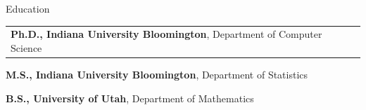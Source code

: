 \begin{rubric}{Education}


\entry*[2019 -- 2024]%
  \begin{tabular}{@{}l}
    \textbf{Ph.D., Indiana University Bloomington}, Department of Computer Science \\
  \end{tabular}

\entry*[2017 -- 2019]%
  \textbf{M.S., Indiana University Bloomington}, Department of Statistics

\entry*[2011 -- 2015]%
  \textbf{B.S., University of Utah}, Department of Mathematics

\end{rubric}